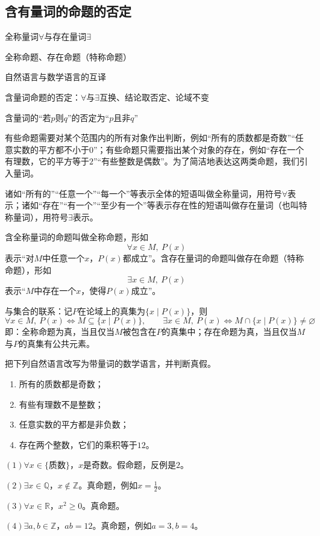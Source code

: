 \clearpage
\subsection{含有量词的命题的否定}
\begin{know}
    \item 全称量词$\forall$与存在量词$\exists$
    \item 全称命题、存在命题（特称命题）
    \item 自然语言与数学语言的互译
    \item 含量词命题的否定：$\forall$与$\exists$互换、结论取否定、论域不变
    \item 含量词的“若$p$则$q$”的否定为“$p$且非$q$”
\end{know}

有些命题需要对某个范围内的所有对象作出判断，例如“所有的质数都是奇数”“任意实数的平方都不小于$0$”；有些命题只需要指出某个对象的存在，例如“存在一个有理数，它的平方等于$2$”“有些整数是偶数”。为了简洁地表达这两类命题，我们引入量词。

\begin{definition}[全称量词与存在量词]
诸如“所有的”“任意一个”“每一个”等表示全体的短语叫做全称量词，用符号$\forall$表示；诸如“存在”“有一个”“至少有一个”等表示存在性的短语叫做存在量词（也叫特称量词），用符号$\exists$表示。

含全称量词的命题叫做全称命题，形如
\[\forall x\in M,\ P(x)\]
表示“对$M$中任意一个$x$，$P(x)$都成立”。含存在量词的命题叫做存在命题（特称命题），形如
\[\exists x\in M,\ P(x)\]
表示“$M$中存在一个$x$，使得$P(x)$成立”。
\end{definition}

与集合的联系：记$P$在论域上的真集为$\{x\mid P(x)\}$，则
\[\forall x\in M,\ P(x)\iff M\subseteq\{x\mid P(x)\},\qquad
\exists x\in M,\ P(x)\iff M\cap\{x\mid P(x)\}\neq\varnothing\]
即：全称命题为真，当且仅当$M$被包含在$P$的真集中；存在命题为真，当且仅当$M$与$P$的真集有公共元素。

\begin{example}
把下列自然语言改写为带量词的数学语言，并判断真假。
\begin{enumerate}
    \item 所有的质数都是奇数；
    \item 有些有理数不是整数；
    \item 任意实数的平方都是非负数；
    \item 存在两个整数，它们的乘积等于$12$。
\end{enumerate}
\end{example}
\begin{jie}
    $(1)$$\forall x\in\{\text{质数}\}$，$x$是奇数。假命题，反例是$2$。

    $(2)$$\exists x\in\mathbb{Q}$，$x\notin\mathbb{Z}$。真命题，例如$x=\frac{1}{2}$。

    $(3)$$\forall x\in\mathbb{R}$，$x^2\geq 0$。真命题。

    $(4)$$\exists a,b\in\mathbb{Z}$，$ab=12$。真命题，例如$a=3,b=4$。
\end{jie}

